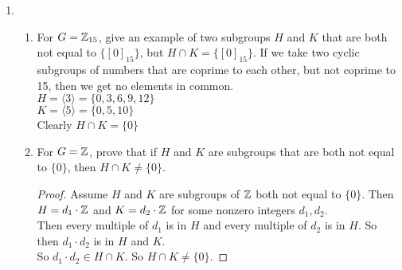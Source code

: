 \documentclass[12pt]{article}
\begin{document}
\begin{enumerate}
		\item \hphantom{}
		\begin{enumerate}
			\item For $G = \mathbb{Z}_{15}$, give an example of two subgroups $H$ and $K$ that are both not equal to $\{[0]_{15}\}$, but $H \cap K = \{[0]_{15}\}$.\m
			If we take two cyclic subgroups of numbers that are coprime to each other, but not coprime to 15, then we get no elements in common.\\
			$H = \langle 3 \rangle = \{0,3,6,9,12\}$\\
			$K = \langle 5 \rangle = \{0,5,10\}$\\
			Clearly $H \cap K = \{0\}$
			\item For $G = \mathbb{Z}$, prove that if $H$ and $K$ are subgroups that are both not equal to $\{0\}$, then $H \cap K \neq \{0\}$.
			\begin{proof}
				Assume $H$ and $K$ are subgroups of $\mathbb{Z}$ both not equal to $\{0\}$. Then $H = d_1\cdot\mathbb{Z}$ and $K = d_2\cdot\mathbb{Z}$ for some nonzero integers $d_1,d_2$.\\
				Then every multiple of $d_1$ is in $H$ and every multiple of $d_2$ is in $H$. So then $d_1 \cdot d_2$ is in $H$ and $K$.\\
				So $d_1 \cdot d_2 \in H \cap K$. So $H \cap K \neq \{0\}$.
				
			\end{proof}
		\end{enumerate}
	\end{enumerate}
\end{document}
